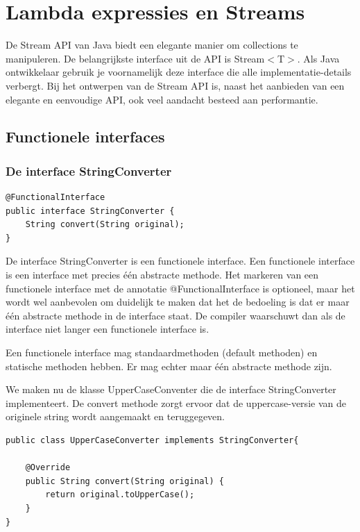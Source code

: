 \chapter{Lambda expressies en Streams}

\begin{summary}
De Stream API van Java biedt een elegante manier om collections te manipuleren. De belangrijkste interface uit de API is Stream$<$T$>$. Als Java ontwikkelaar gebruik je voornamelijk deze interface die alle implementatie-details verbergt. Bij het ontwerpen van de Stream API is, naast het aanbieden van een elegante en eenvoudige API, ook veel aandacht besteed aan performantie. 
\end{summary}

\section{Functionele interfaces}

\subsection{De interface StringConverter}

\begin{lstlisting}
@FunctionalInterface
public interface StringConverter {
	String convert(String original);
}
\end{lstlisting}

De interface StringConverter is een functionele interface. Een functionele interface is een interface met precies \'e\'en abstracte methode.  Het markeren van een functionele interface met de annotatie @FunctionalInterface is optioneel, maar het wordt wel aanbevolen om duidelijk te maken dat het de bedoeling is dat er maar \'e\'en abstracte methode in de interface staat.  De compiler waarschuwt dan als de interface niet langer een functionele interface is.

Een functionele interface mag standaardmethoden (default methoden) en statische methoden hebben.  Er mag echter maar \'e\'en abstracte methode zijn.

We maken nu de klasse UpperCaseConventer die de interface StringConverter implementeert. 
De convert methode zorgt ervoor dat de uppercase-versie van de originele string wordt aangemaakt en teruggegeven.

\begin{lstlisting}
public class UpperCaseConverter implements StringConverter{

	@Override
	public String convert(String original) {
		return original.toUpperCase();
	}
}
\end{lstlisting}


